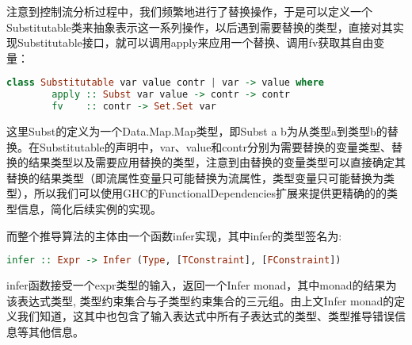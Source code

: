 \documentclass[12pt, titlepage]{article}
\begin{document}
	注意到控制流分析过程中，我们频繁地进行了替换操作，于是可以定义一个Substitutable类来抽象表示这一系列操作，以后遇到需要替换的类型，直接对其实现Substitutable接口，就可以调用apply来应用一个替换、调用fv获取其自由变量：
	\begin{lstlisting}[language=haskell]
class Substitutable var value contr | var -> value where
    	apply :: Subst var value -> contr -> contr
    	fv    :: contr -> Set.Set var
	\end{lstlisting}
	
	这里Subst的定义为一个Data.Map.Map类型，即Subst a b为从类型a到类型b的替换。在Substitutable的声明中，var、value和contr分别为需要替换的变量类型、替换的结果类型以及需要应用替换的类型，注意到由替换的变量类型可以直接确定其替换的结果类型（即流属性变量只可能替换为流属性，类型变量只可能替换为类型），所以我们可以使用GHC的FunctionalDependencies扩展\cite{fundep}来提供更精确的的类型信息，简化后续实例的实现。
	
	而整个推导算法的主体由一个函数infer实现，其中infer的类型签名为:
	\begin{lstlisting}[language=haskell]
infer :: Expr -> Infer (Type, [TConstraint], [FConstraint])
	\end{lstlisting}
	infer函数接受一个expr类型的输入，返回一个Infer monad，其中monad的结果为该表达式类型, 类型约束集合与子类型约束集合的三元组。由上文Infer monad的定义我们知道，这其中也包含了输入表达式中所有子表达式的类型、类型推导错误信息等其他信息。
\end{document}
